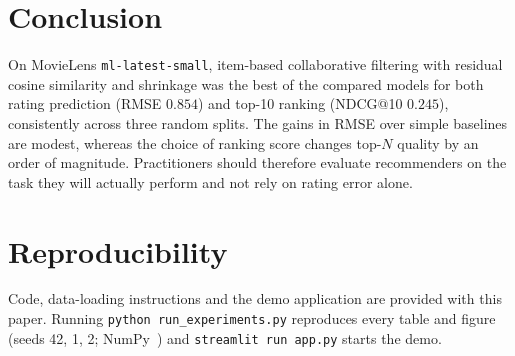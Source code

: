 \documentclass[conference]{IEEEtran}
\begin{document}
\section{Conclusion}
On MovieLens \texttt{ml-latest-small}, item-based collaborative filtering with residual cosine similarity and shrinkage was the best of the compared models for both rating prediction (RMSE $0.854$) and top-10 ranking (NDCG@10 $0.245$), consistently across three random splits. The gains in RMSE over simple baselines are modest, whereas the choice of ranking score changes top-$N$ quality by an order of magnitude. Practitioners should therefore evaluate recommenders on the task they will actually perform and not rely on rating error alone.

\section*{Reproducibility}
Code, data-loading instructions and the demo application are provided with this paper. Running \texttt{python run\_experiments.py} reproduces every table and figure (seeds 42, 1, 2; NumPy~\cite{harris2020}) and \texttt{streamlit run app.py} starts the demo.



\end{document}
